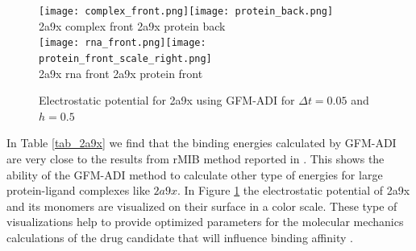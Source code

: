 \begin{figure}[!ht]
	\begin{center}
		\texttt{[image: complex\_front.png]}\texttt{[image: protein\_back.png]}\\
		\hskip 0.5in 2a9x complex front\hskip 2.5in 2a9x  protein back\\
		\texttt{[image: rna\_front.png]}\texttt{[image: protein\_front\_scale\_right.png]}\\
		\hskip 0.7in 2a9x rna front\hskip 2.8in 2a9x  protein front\\
		\caption{Electrostatic potential for 2a9x using GFM-ADI for $\Delta t = 0.05$ and $h = 0.5$}
		\label{fig:2a9x}
	\end{center}
\end{figure}


In Table \ref{tab_2a9x} we find that the binding energies calculated by GFM-ADI are very close to the results from rMIB method reported in \cite{Geng2017a}. This shows the ability of the GFM-ADI method to calculate other type of energies for large protein-ligand complexes like $2a9x$. In Figure \ref{fig:2a9x} the electrostatic potential of 2a9x and its monomers are visualized on their surface in a color scale. These type of visualizations help to provide optimized parameters for the molecular mechanics calculations of the drug candidate that will influence binding affinity \cite{drug2012}.      




